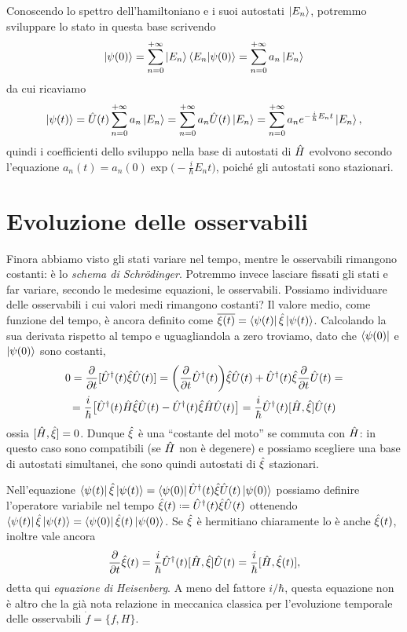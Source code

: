 Conoscendo lo spettro dell'hamiltoniano e i suoi autostati $\left|{E_n}\right\rangle$, potremmo sviluppare lo stato in questa base scrivendo
\begin{equation}
	\left|{\psi(0)}\right\rangle=\sum_{n=0}^{+\infty}\left|{E_n}\right\rangle\left\langle{E_n}\middle|{\psi(0)}\right\rangle=\sum_{n=0}^{+\infty}a_n\left|{E_n}\right\rangle
\end{equation}
da cui ricaviamo
\begin{equation}
	\left|{\psi(t)}\right\rangle=\hat{U}(t)\sum_{n=0}^{+\infty}a_n\left|{E_n}\right\rangle=\sum_{n=0}^{+\infty}a_n\hat{U}(t)\left|{E_n}\right\rangle=\sum_{n=0}^{+\infty}a_ne^{-\frac{i}{\hbar}E_nt}\left|{E_n}\right\rangle,
\end{equation}
quindi i coefficienti dello sviluppo nella base di autostati di $\hat{H}$ evolvono secondo l'equazione $a_n(t)=a_n(0)\exp\big(-\frac{i}{\hbar}E_nt\big)$, poich\'e gli autostati sono stazionari.

\section{Evoluzione delle osservabili}
Finora abbiamo visto gli stati variare nel tempo, mentre le osservabili rimangono costanti: è lo \emph{schema di Schr\"odinger}.
Potremmo invece lasciare fissati gli stati e far variare, secondo le medesime equazioni, le osservabili.
Possiamo individuare delle osservabili i cui valori medi rimangono costanti?
Il valore medio, come funzione del tempo, è ancora definito come $\overline{\xi(t)}=\left\langle{\psi(t)}\right|\hat{\xi}\left|{\psi(t)}\right\rangle$.
Calcolando la sua derivata rispetto al tempo e uguagliandola a zero troviamo, dato che $\left\langle{\psi(0)}\right|$ e $\left|{\psi(0)}\right\rangle$ sono costanti,
\begin{multline}
	0=\frac{\partial {}}{\partial {t}}[{\hat{U}}^\dagger(t)\hat{\xi}\hat{U}(t)]=\bigg(\frac{\partial {}}{\partial {t}}{\hat{U}}^\dagger(t)\bigg)\hat{\xi}\hat{U}(t)+{\hat{U}}^\dagger(t)\hat{\xi}\frac{\partial {}}{\partial {t}}\hat{U}(t)=\\
	=\frac{i}{\hbar}\big[{\hat{U}}^\dagger(t)\hat{H}\hat{\xi}\hat{U}(t)-{\hat{U}}^\dagger(t)\hat{\xi}\hat{H}\hat{U}(t)\big]=\frac{i}{\hbar}{\hat{U}}^\dagger(t)[\hat{H},\hat{\xi}]\hat{U}(t)
\end{multline}
ossia $[\hat{H},\hat{\xi}]=0$.
Dunque $\hat{\xi}$ è una ``costante del moto'' se commuta con $\hat{H}$: in questo caso sono compatibili (se $\hat{H}$ non è degenere) e possiamo scegliere una base di autostati simultanei, che sono quindi autostati di $\hat{\xi}$ stazionari.

Nell'equazione $\left\langle{\psi(t)}\right|\hat{\xi}\left|{\psi(t)}\right\rangle=\left\langle{\psi(0)}\right|{\hat{U}}^\dagger(t)\hat{\xi}\hat{U}(t)\left|{\psi(0)}\right\rangle$ possiamo definire l'operatore variabile nel tempo $\op\xi(t)\defeq\adj{\op U}(t)\op\xi\op U(t)$ ottenendo $\left\langle{\psi(t)}\right|\hat{\xi}\left|{\psi(t)}\right\rangle=\left\langle{\psi(0)}\right|\hat{\xi}(t)\left|{\psi(0)}\right\rangle$.
Se $\hat{\xi}$ è hermitiano chiaramente lo è anche $\hat{\xi}(t)$, inoltre vale ancora
\begin{equation}
	\frac{\partial {}}{\partial {t}}\hat{\xi}(t)=\frac{i}{\hbar}{\hat{U}}^\dagger(t)[\hat{H},\hat{\xi}]\hat{U}(t)=\frac{i}{\hbar}[\hat{H},\hat{\xi}(t)],
	\label{eq:evoluzione-osservabili-heisenberg}
\end{equation}
detta qui \emph{equazione di Heisenberg}.
A meno del fattore $i/\hbar$, questa equazione non è altro che la già nota relazione in meccanica classica per l'evoluzione temporale delle osservabili $\dot{f}=\{f,H\}$.

